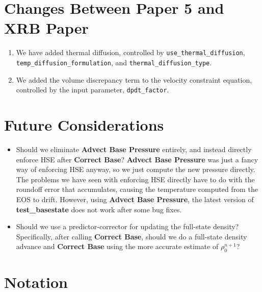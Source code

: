 \section{Changes Between Paper 5 and XRB Paper}
\begin{enumerate}
\item We have added thermal diffusion, controlled by {\tt use\_thermal\_diffusion},
{\tt temp\_diffusion\_formulation}, and {\tt thermal\_diffusion\_type}.
\item We added the volume discrepancy term to the velocity constraint equation,
controlled by the input parameter, {\tt dpdt\_factor}.
\end{enumerate}


\section{Future Considerations}

\begin{itemize}

\item Should we eliminate {\bf Advect Base Pressure} entirely, and instead directly
enforce HSE after {\bf Correct Base}?  {\bf Advect Base Pressure} was just a fancy
way of enforcing HSE anyway, so we just compute the new pressure directly.  The
problems we have seen with enforcing HSE directly have to do with the roundoff
error that accumulates, causing the temperature computed from the EOS to drift.
However, using {\bf Advect Base Pressure}, the latest version of {\bf test\_basestate}
does not work after some bug fixes.

\item Should we use a predictor-corrector for updating the full-state density?
Specifically, after calling {\bf Correct Base}, should we do a full-state density 
advance and {\bf Correct Base} using the more accurate estimate of $\rho_0^{n+1}$?

\end{itemize}


\section{Notation}

